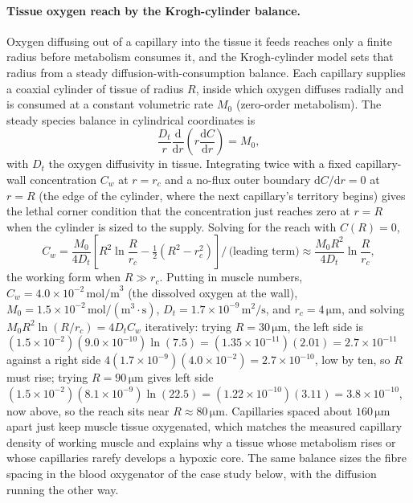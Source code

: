 \paragraph{Tissue oxygen reach by the Krogh-cylinder balance.} Oxygen
diffusing out of a capillary into the tissue it feeds reaches only a
finite radius before metabolism consumes it, and the Krogh-cylinder model
sets that radius from a steady diffusion-with-consumption balance. Each
capillary supplies a coaxial cylinder of tissue of radius $R$, inside
which oxygen diffuses radially and is consumed at a constant volumetric
rate $M_0$ (zero-order metabolism). The steady species balance in
cylindrical coordinates is
\[
\frac{D_t}{r}\frac{\mathrm{d}}{\mathrm{d}r}\!\left(r\frac{\mathrm{d}C}
{\mathrm{d}r}\right) = M_0,
\]
with $D_t$ the oxygen diffusivity in tissue. Integrating twice with a
fixed capillary-wall concentration $C_w$ at $r = r_c$ and a no-flux outer
boundary $\mathrm{d}C/\mathrm{d}r = 0$ at $r = R$ (the edge of the
cylinder, where the next capillary's territory begins) gives the lethal
corner condition that the concentration just reaches zero at $r = R$ when
the cylinder is sized to the supply. Solving for the reach with $C(R) = 0$,
\[
C_w = \frac{M_0}{4 D_t}\!\left[R^2\ln\!\frac{R}{r_c} - \tfrac{1}{2}
(R^2 - r_c^2)\right]\Big/\,\text{(leading term)} \approx
\frac{M_0 R^2}{4 D_t}\ln\!\frac{R}{r_c},
\]
the working form when $R \gg r_c$. Putting in muscle numbers, $C_w =
4.0\times 10^{-2}\,\text{mol/m}^3$ (the dissolved oxygen at the wall),
$M_0 = 1.5\times 10^{-2}\,\text{mol}/(\text{m}^3\cdot\text{s})$,
$D_t = 1.7\times 10^{-9}\,\si{\meter\squared\per\second}$, and $r_c =
4\,\si{\micro\meter}$, and solving $M_0 R^2 \ln(R/r_c) = 4 D_t C_w$
iteratively: trying $R = 30\,\si{\micro\meter}$, the left side is
$(1.5\times 10^{-2})(9.0\times 10^{-10})\ln(7.5) = (1.35\times 10^{-11})
(2.01) = 2.7\times 10^{-11}$ against a right side $4(1.7\times 10^{-9})
(4.0\times 10^{-2}) = 2.7\times 10^{-10}$, low by ten, so $R$ must rise;
trying $R = 90\,\si{\micro\meter}$ gives left side $(1.5\times 10^{-2})
(8.1\times 10^{-9})\ln(22.5) = (1.22\times 10^{-10})(3.11) = 3.8\times
10^{-10}$, now above, so the reach sits near $R \approx 80\,\si{
\micro\meter}$. Capillaries spaced about $160\,\si{\micro\meter}$ apart
just keep muscle tissue oxygenated, which matches the measured capillary
density of working muscle and explains why a tissue whose metabolism rises
or whose capillaries rarefy develops a hypoxic core. The same balance
sizes the fibre spacing in the blood oxygenator of the case study below,
with the diffusion running the other way.

